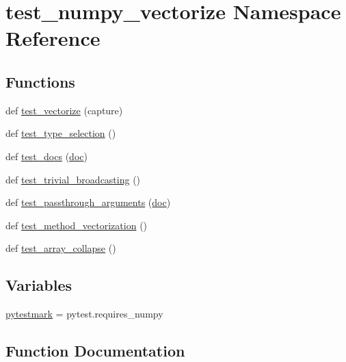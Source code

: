 \hypertarget{namespacetest__numpy__vectorize}{}\section{test\+\_\+numpy\+\_\+vectorize Namespace Reference}
\label{namespacetest__numpy__vectorize}
\subsection*{Functions}
\begin{DoxyCompactItemize}
\item 
def \mbox{\hyperlink{namespacetest__numpy__vectorize_a369e5d01c68feccc3b699993aa09f894}{test\+\_\+vectorize}} (capture)
\item 
def \mbox{\hyperlink{namespacetest__numpy__vectorize_afd84b920322c6760a2bfc04c3cd8bd82}{test\+\_\+type\+\_\+selection}} ()
\item 
def \mbox{\hyperlink{namespacetest__numpy__vectorize_aae9e3e6ce52f300e08d4991f81ab3f89}{test\+\_\+docs}} (\mbox{\hyperlink{structdoc}{doc}})
\item 
def \mbox{\hyperlink{namespacetest__numpy__vectorize_a9f9f2aa507f08045c57f4bd805d51858}{test\+\_\+trivial\+\_\+broadcasting}} ()
\item 
def \mbox{\hyperlink{namespacetest__numpy__vectorize_aaa58b980a34351dae93964a32e331ce6}{test\+\_\+passthrough\+\_\+arguments}} (\mbox{\hyperlink{structdoc}{doc}})
\item 
def \mbox{\hyperlink{namespacetest__numpy__vectorize_a5f0c10b58ddd7b359f89e5c1eca39f28}{test\+\_\+method\+\_\+vectorization}} ()
\item 
def \mbox{\hyperlink{namespacetest__numpy__vectorize_af8b16ee4519e53decf6bebc3c7f9bd44}{test\+\_\+array\+\_\+collapse}} ()
\end{DoxyCompactItemize}
\subsection*{Variables}
\begin{DoxyCompactItemize}
\item 
\mbox{\hyperlink{namespacetest__numpy__vectorize_a240730e7d9cb184a6667df5809ee7ee8}{pytestmark}} = pytest.\+requires\+\_\+numpy
\end{DoxyCompactItemize}


\subsection{Function Documentation}
\mbox{\label{namespacetest__numpy__vectorize_af8b16ee4519e53decf6bebc3c7f9bd44}} 
